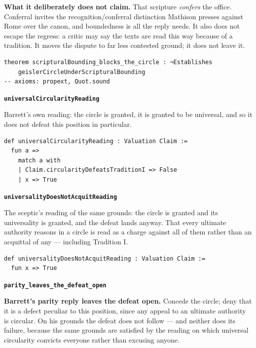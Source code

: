 \documentclass[11pt]{article}
\begin{document}
\textbf{What it deliberately does not claim.} That scripture \emph{confers} the office. Conferral invites the recognition/conferral distinction Mathison presses against Rome over the canon, and boundedness is all the reply needs. It also does not escape the regress: a critic may say the texts are read this way because of a tradition. It moves the dispute to far less contested ground; it does not leave it.

{\small\begin{verbatim}
theorem scripturalBounding_blocks_the_circle : ¬Establishes
    geislerCircleUnderScripturalBounding
-- axioms: propext, Quot.sound
\end{verbatim}}
\par\medskip\noindent\textbf{\texttt{universal\allowbreak{}Circularity\allowbreak{}Reading}}\par\nobreak\noindent
Barrett’s own reading: the circle is granted, it is granted to be universal, and so it does not defeat this position in particular.

{\small\begin{verbatim}
def universalCircularityReading : Valuation Claim :=
  fun a =>
    match a with
    | Claim.circularityDefeatsTraditionI => False
    | x => True
\end{verbatim}}
\par\medskip\noindent\textbf{\texttt{universality\allowbreak{}Does\allowbreak{}Not\allowbreak{}Acquit\allowbreak{}Reading}}\par\nobreak\noindent
The sceptic’s reading of the same grounds: the circle is granted and its universality is granted, and the defeat lands anyway. That every ultimate authority reasons in a circle is read as a charge against all of them rather than an acquittal of any — including Tradition I.

{\small\begin{verbatim}
def universalityDoesNotAcquitReading : Valuation Claim :=
  fun x => True
\end{verbatim}}
\par\medskip\noindent\textbf{\texttt{parity\_\allowbreak{}leaves\_\allowbreak{}the\_\allowbreak{}defeat\_\allowbreak{}open}}\par\nobreak\noindent
\textbf{Barrett’s parity reply leaves the defeat open.} Concede the circle; deny that it is a defect peculiar to this position, since any appeal to an ultimate authority is circular. On his grounds the defeat does not follow — and neither does its failure, because the same grounds are satisfied by the reading on which universal circularity convicts everyone rather than excusing anyone.
\end{document}
